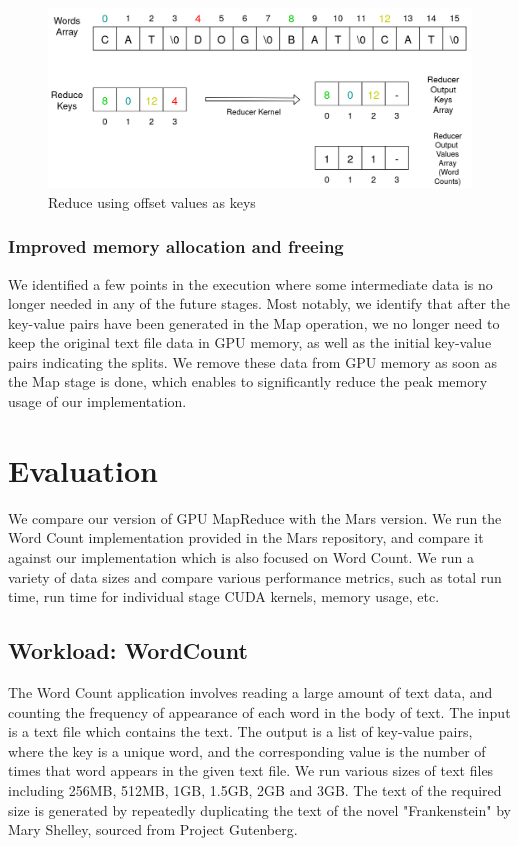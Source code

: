 \documentclass{article}
\begin{document}
\begin{figure}[h]
    \centering
    \includegraphics[width=0.9\linewidth]{images/reduce-kv-out.png}
    \caption{Reduce using offset values as keys}
    \label{fig:reduce-kv-out}
\end{figure}

\subsubsection{Improved memory allocation and freeing} \label{improved-free}
We identified a few points in the execution where some intermediate data is no longer needed in any of the future stages. Most notably, we identify that after the key-value pairs have been generated in the Map operation, we no longer need to keep the original text file data in GPU memory, as well as the initial key-value pairs indicating the splits. We remove these data from GPU memory as soon as the Map stage is done, which enables to significantly reduce the peak memory usage of our implementation.

\section{Evaluation}
We compare our version of GPU MapReduce with the Mars version. We run the Word Count implementation provided in the Mars repository, and compare it against our implementation which is also focused on Word Count. We run a variety of data sizes and compare various performance metrics, such as total run time, run time for individual stage CUDA kernels, memory usage, etc.

\subsection{Workload: WordCount}
The Word Count application involves reading a large amount of text data, and counting the frequency of appearance of each word in the body of text. The input is a text file which contains the text. The output is a list of key-value pairs, where the key is a unique word, and the corresponding value is the number of times that word appears in the given text file. We run various sizes of text files including 256MB, 512MB, 1GB, 1.5GB, 2GB and 3GB. The text of the required size is generated by repeatedly duplicating the text of the novel "Frankenstein" by Mary Shelley, sourced from Project Gutenberg.  
\end{document}
